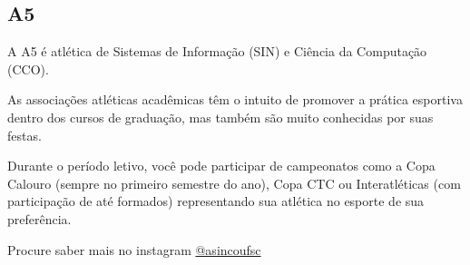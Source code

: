 \subsection{A5}

A A5 é atlética de Sistemas de Informação (SIN) e Ciência da Computação (CCO).

As associações atléticas acadêmicas têm o intuito de promover a prática esportiva dentro dos cursos de graduação, mas também são muito conhecidas por suas festas.

Durante o período letivo, você pode participar de campeonatos como a Copa Calouro (sempre no primeiro semestre do ano), Copa CTC ou Interatléticas (com participação de até formados) representando sua atlética no esporte de sua preferência.

Procure saber mais no instagram \href{https://www.instagram.com/a5ufsc/}{@asincoufsc}
